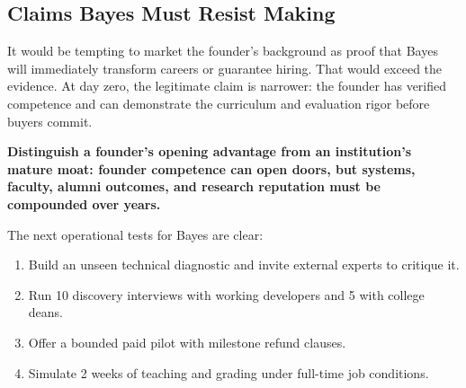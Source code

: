 \subsection{Claims Bayes Must Resist Making}

It would be tempting to market the founder's background as proof that Bayes will immediately transform careers or guarantee hiring. That would exceed the evidence. At day zero, the legitimate claim is narrower: the founder has verified competence and can demonstrate the curriculum and evaluation rigor before buyers commit.

\textbf{Distinguish a founder's opening advantage from an institution's mature moat: founder competence can open doors, but systems, faculty, alumni outcomes, and research reputation must be compounded over years.}

The next operational tests for Bayes are clear:
\begin{enumerate}[label=\textbf{\arabic*.},leftmargin=11pt,itemsep=1.5pt,topsep=1.5pt,parsep=0pt]
  \item Build an unseen technical diagnostic and invite external experts to critique it.
  \item Run 10 discovery interviews with working developers and 5 with college deans.
  \item Offer a bounded paid pilot with milestone refund clauses.
  \item Simulate 2 weeks of teaching and grading under full-time job conditions.
\end{enumerate}
